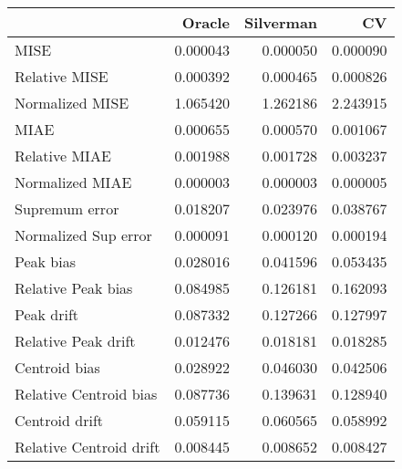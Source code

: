 \begin{tabular}{lrrr}
  \toprule
 & Oracle & Silverman & CV \\ 
  \midrule
MISE & 0.000043 & 0.000050 & 0.000090 \\ 
  Relative MISE & 0.000392 & 0.000465 & 0.000826 \\ 
  Normalized MISE & 1.065420 & 1.262186 & 2.243915 \\ 
  MIAE & 0.000655 & 0.000570 & 0.001067 \\ 
  Relative MIAE & 0.001988 & 0.001728 & 0.003237 \\ 
  Normalized MIAE & 0.000003 & 0.000003 & 0.000005 \\ 
  Supremum error & 0.018207 & 0.023976 & 0.038767 \\ 
  Normalized Sup error & 0.000091 & 0.000120 & 0.000194 \\ 
  Peak bias & 0.028016 & 0.041596 & 0.053435 \\ 
  Relative Peak bias & 0.084985 & 0.126181 & 0.162093 \\ 
  Peak drift & 0.087332 & 0.127266 & 0.127997 \\ 
  Relative Peak drift & 0.012476 & 0.018181 & 0.018285 \\ 
  Centroid bias & 0.028922 & 0.046030 & 0.042506 \\ 
  Relative Centroid bias & 0.087736 & 0.139631 & 0.128940 \\ 
  Centroid drift & 0.059115 & 0.060565 & 0.058992 \\ 
  Relative Centroid drift & 0.008445 & 0.008652 & 0.008427 \\ 
   \bottomrule
\end{tabular}
